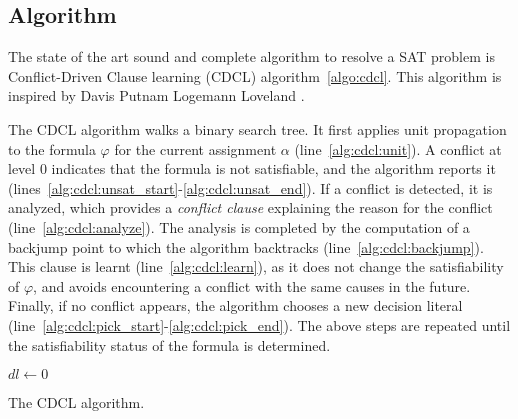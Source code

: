 \subsection{Algorithm}

The state of the art sound and complete algorithm to resolve a SAT problem is 
Conflict-Driven Clause learning (CDCL) algorithm~\ref{algo:cdcl}.
This algorithm is inspired by Davis Putnam Logemann Loveland \cite{dpll_62}.


The CDCL algorithm walks a binary search tree.  It first applies unit propagation to
the formula $\varphi$ for the current assignment $\alpha$ (line~\ref{alg:cdcl:unit}).
A conflict at level $0$ indicates that the formula is not satisfiable, and the algorithm
reports it (lines~\ref{alg:cdcl:unsat_start}-\ref{alg:cdcl:unsat_end}).
If a conflict is detected, it is analyzed, which provides a \emph{conflict clause} 
explaining the reason for the conflict (line~\ref{alg:cdcl:analyze}).
The analysis is completed by the computation of a
backjump point to which the algorithm backtracks (line~\ref{alg:cdcl:backjump}).
  This clause is learnt (line~\ref{alg:cdcl:learn}), as it does not change the
satisfiability of $\varphi$, and avoids encountering a conflict with the same
causes in the future.
Finally, if no conflict appears, the algorithm chooses a new decision literal 
(line~\ref{alg:cdcl:pick_start}-\ref{alg:cdcl:pick_end}).
The above steps are repeated until the satisfiability status of the formula is determined.


\begin{algorithm}
	{
		$dl \gets 0$ 
		\Return \true
	}
	\caption{The CDCL algorithm.}
	\label{algo:cdcl}
	
\end{algorithm}




